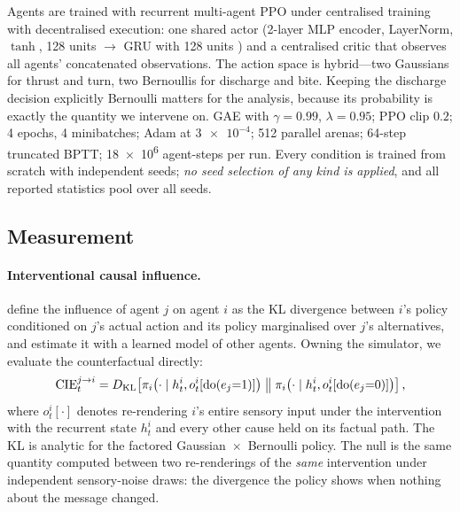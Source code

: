 Agents are trained with recurrent multi-agent PPO
\citep{yu2022surprising,schulman2017proximal} under centralised training with
decentralised execution: one shared actor (2-layer MLP encoder, LayerNorm, $\tanh$,
128 units $\rightarrow$ GRU with 128 units \citep{cho2014learning}) and a
centralised critic that observes all agents' concatenated observations. The action
space is hybrid---two Gaussians for thrust and turn, two Bernoullis for discharge
and bite. Keeping the discharge decision explicitly Bernoulli matters for the
analysis, because its probability is exactly the quantity we intervene on. GAE
\citep{schulman2016high} with $\gamma=0.99$, $\lambda=0.95$; PPO clip $0.2$; 4
epochs, 4 minibatches; Adam at $\num{3e-4}$; 512 parallel arenas; 64-step
truncated BPTT; \SI{18e6}{} agent-steps per run. Every condition is trained from
scratch with independent seeds; \emph{no seed selection of any kind is applied},
and all reported statistics pool over all seeds.

\subsection{Measurement}

\paragraph{Interventional causal influence.}
\citet{jaques2019social} define the influence of agent $j$ on agent $i$ as the KL
divergence between $i$'s policy conditioned on $j$'s actual action and its policy
marginalised over $j$'s alternatives, and estimate it with a learned model of
other agents. Owning the simulator, we evaluate the counterfactual directly:
\begin{equation}
\mathrm{CIE}^{j\to i}_t = D_{\mathrm{KL}}\!\left[
  \pi_i\!\left(\cdot \mid h^i_t, o^i_t[\mathrm{do}(e_j{=}1)]\right)
  \;\middle\|\;
  \pi_i\!\left(\cdot \mid h^i_t, o^i_t[\mathrm{do}(e_j{=}0)]\right)\right],
\label{eq:cie}
\end{equation}
where $o^i_t[\cdot]$ denotes re-rendering $i$'s entire sensory input under the
intervention with the recurrent state $h^i_t$ and every other cause held on its
factual path. The KL is analytic for the factored
Gaussian~$\times$~Bernoulli policy. The null is the same quantity computed between
two re-renderings of the \emph{same} intervention under independent sensory-noise
draws: the divergence the policy shows when nothing about the message changed.

